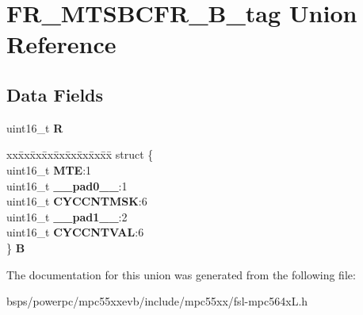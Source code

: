 \hypertarget{unionFR__MTSBCFR__16B__tag}{}\section{F\+R\+\_\+\+M\+T\+S\+B\+C\+F\+R\+\_\+B\+\_\+tag Union Reference}
\label{unionFR__MTSBCFR__16B__tag}
\subsection*{Data Fields}
\begin{DoxyCompactItemize}
\item 
\mbox{\label{unionFR__MTSBCFR__16B__tag_a22b410bed407890e65ca6095b2f51932}} 
uint16\+\_\+t {\bfseries R}
\item 
\mbox{\label{unionFR__MTSBCFR__16B__tag_a231a327e694338926e3c0d59f73d7772}} 
\begin{tabbing}
xx\=xx\=xx\=xx\=xx\=xx\=xx\=xx\=xx\=\kill
struct \{\\
\>uint16\_t {\bfseries MTE}:1\\
\>uint16\_t {\bfseries \_\_pad0\_\_}:1\\
\>uint16\_t {\bfseries CYCCNTMSK}:6\\
\>uint16\_t {\bfseries \_\_pad1\_\_}:2\\
\>uint16\_t {\bfseries CYCCNTVAL}:6\\
\} {\bfseries B}\\

\end{tabbing}\end{DoxyCompactItemize}


The documentation for this union was generated from the following file\+:\begin{DoxyCompactItemize}
\item 
bsps/powerpc/mpc55xxevb/include/mpc55xx/fsl-\/mpc564x\+L.\+h\end{DoxyCompactItemize}
